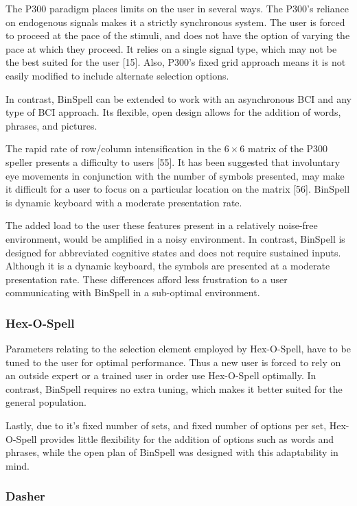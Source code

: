\documentclass[12pt,titlepage]{article}
\begin{document}
The P300 paradigm places limits on the user in several ways.  The P300's reliance on 
endogenous signals makes it a strictly synchronous system.  The user is forced to proceed at the 
pace of the stimuli, and does not have the option of varying the pace at which they proceed.  It 
relies on a single signal type, which may not be the best suited for the user [15].  Also, P300's 
fixed grid approach means it is not easily modified to include alternate selection options.

In contrast, BinSpell can be extended to work with an asynchronous BCI and any type of BCI 
approach.  Its flexible, open design allows for the addition of words, phrases, and pictures.

The rapid rate of row/column intensification in the $6\times6$ matrix of the P300 speller presents a 
difficulty to users [55].  It has been suggested that involuntary eye movements in conjunction with 
the number of symbols presented, may make it difficult for a user to focus on a particular 
location on the matrix [56].  BinSpell is dynamic keyboard with a moderate presentation rate. 

The added load to the user these features present in a relatively noise-free environment, would 
be amplified in a noisy environment.  In contrast, BinSpell is designed for abbreviated 
cognitive states and does not require sustained inputs.  Although it is a dynamic keyboard, the 
symbols are presented at a moderate presentation rate.  These differences afford less frustration 
to a user communicating with BinSpell in a sub-optimal environment.

\subsubsection{Hex-O-Spell}

Parameters relating to the selection element employed by Hex-O-Spell, have to be tuned to the 
user for optimal performance.  Thus a new user is forced to rely on an outside expert or a 
trained user in order use Hex-O-Spell optimally.  In contrast, BinSpell requires no extra tuning, 
which makes it better suited for the general population. 

Lastly, due to it's fixed number of sets, and fixed number of options per set, Hex-O-Spell 
provides little flexibility for the addition of options such as words and phrases, while the open 
plan of BinSpell was designed with this adaptability in mind.

\subsubsection{Dasher}
\end{document}
